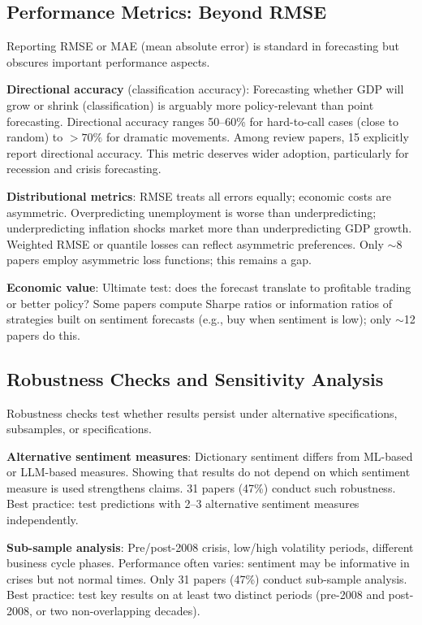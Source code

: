 \documentclass[11pt]{article}
\begin{document}
\subsection{Performance Metrics: Beyond RMSE}

Reporting RMSE or MAE (mean absolute error) is standard in forecasting but obscures important performance aspects.

\textbf{Directional accuracy} (classification accuracy): Forecasting whether GDP will grow or shrink (classification) is arguably more policy-relevant than point forecasting. Directional accuracy ranges 50--60\% for hard-to-call cases (close to random) to $>70\%$ for dramatic movements. Among review papers, 15 explicitly report directional accuracy. This metric deserves wider adoption, particularly for recession and crisis forecasting.

\textbf{Distributional metrics}: RMSE treats all errors equally; economic costs are asymmetric. Overpredicting unemployment is worse than underpredicting; underpredicting inflation shocks market more than underpredicting GDP growth. Weighted RMSE or quantile losses can reflect asymmetric preferences. Only $\sim$8 papers employ asymmetric loss functions; this remains a gap.

\textbf{Economic value}: Ultimate test: does the forecast translate to profitable trading or better policy? Some papers compute Sharpe ratios or information ratios of strategies built on sentiment forecasts (e.g., buy when sentiment is low); only $\sim$12 papers do this.

\subsection{Robustness Checks and Sensitivity Analysis}

Robustness checks test whether results persist under alternative specifications, subsamples, or specifications.

\textbf{Alternative sentiment measures}: Dictionary sentiment differs from ML-based or LLM-based measures. Showing that results do not depend on which sentiment measure is used strengthens claims. 31 papers (47\%) conduct such robustness. Best practice: test predictions with 2--3 alternative sentiment measures independently.

\textbf{Sub-sample analysis}: Pre/post-2008 crisis, low/high volatility periods, different business cycle phases. Performance often varies: sentiment may be informative in crises but not normal times. Only 31 papers (47\%) conduct sub-sample analysis. Best practice: test key results on at least two distinct periods (pre-2008 and post-2008, or two non-overlapping decades).
\end{document}
